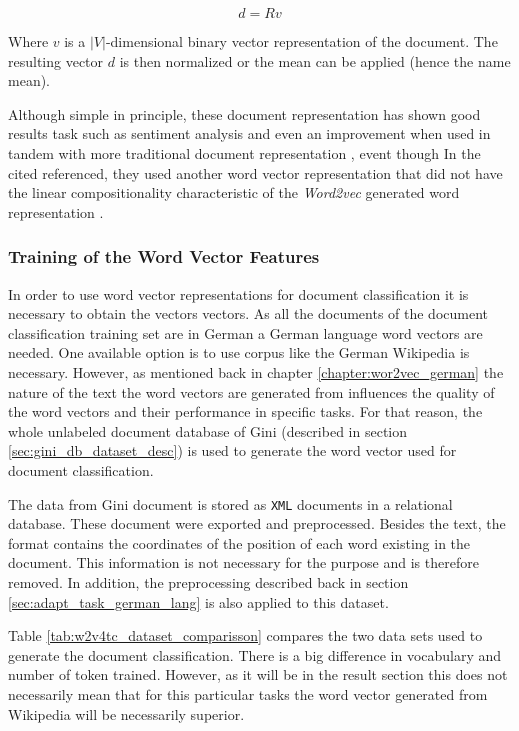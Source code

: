 $$d = Rv$$

Where $v$ is a $|V|$-dimensional  binary vector representation of the
document.   The resulting vector $d$ is then  normalized or the mean can be
applied (hence the name mean).


Although simple in principle, these document representation has  shown good
results task such as sentiment analysis and even an improvement when used in tandem
with more traditional document representation  \cite{maas2010probabilistic},
event though In the cited referenced, they used another word vector representation that
did not have the linear compositionality characteristic of the
\textit{Word2vec} generated word representation \cite{MikolovSCCD13}.


\subsubsection{Training of the Word Vector Features}
\label{sec:sub_w2v_4tc_training-word-vector}
In order to use word vector representations for  document classification it
is necessary to obtain the vectors vectors.  As all the documents of the
document classification training set are in German a German language word
vectors are needed.  One available option is to use  corpus like the German
Wikipedia is necessary. However, as mentioned back in chapter
\ref{chapter:wor2vec_german} the nature of the text the word vectors are generated from influences the quality of the word vectors and their
performance in specific tasks. For that reason, the whole unlabeled document
database of Gini  (described in section \ref{sec:gini_db_dataset_desc})   is
used to generate the word vector used for document classification. 

The data from Gini document is stored as \texttt{XML} documents in a
relational database. These document were exported and preprocessed. Besides
the text, the format contains the coordinates of the position of each word
existing in the document. This information is not necessary for the purpose
and is therefore removed. In addition, the preprocessing described back in
section \ref{sec:adapt_task_german_lang} is also applied to this dataset.

Table \ref{tab:w2v4tc_dataset_comparisson} compares the two data sets used
to generate the document classification. There is a big difference in
vocabulary and number of token trained. However, as it will be in the result
section this does not necessarily mean that for this particular tasks the
word vector generated from Wikipedia will be necessarily superior.

